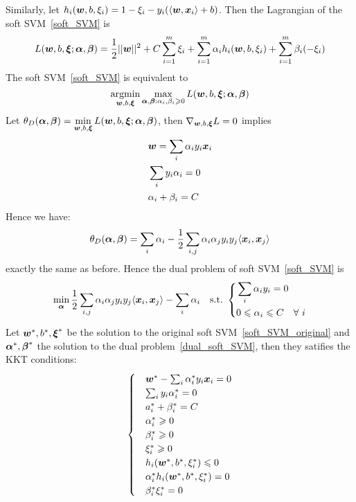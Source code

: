 Similarly, let $h_i(\boldsymbol{w}, b, \xi_i) = 1 - \xi_i - y_i(\langle\boldsymbol{w}, \boldsymbol{x}_i\rangle + b)$. Then the Lagrangian
of the soft SVM~\eqref{soft_SVM} is
$$L(\boldsymbol{w}, b, \boldsymbol{\xi}; \boldsymbol{\alpha}, \boldsymbol{\beta}) = \frac{1}{2}||\boldsymbol{w}||^2 + C\sum_{i=1}^m \xi_i + \sum_{i=1}^m
\alpha_i h_i(\boldsymbol{w}, b, \xi_i) + \sum_{i=1}^m \beta_i (-\xi_i)$$
The soft SVM~\eqref{soft_SVM} is equivalent to
$$\operatorname*{argmin}_{\boldsymbol{w}, b, \boldsymbol{\xi}}\max_{\boldsymbol{\alpha}, \boldsymbol{\beta}: \alpha_i, \beta_i \geqslant 0}
L(\boldsymbol{w}, b, \boldsymbol{\xi}; \boldsymbol{\alpha}, \boldsymbol{\beta})$$
Let $\displaystyle\theta_D(\boldsymbol{\alpha}, \boldsymbol{\beta}) = \min_{\boldsymbol{w}, b, \boldsymbol{\xi}}L(\boldsymbol{w}, b, \boldsymbol{\xi}; \boldsymbol{\alpha}, 
\boldsymbol{\beta})$, then $\nabla_{\boldsymbol{w}, b, \boldsymbol{\xi}} L = 0$ implies
\begin{subequations}
    \begin{align}
    &\boldsymbol{w} = \sum_i \alpha_i y_i \boldsymbol{x}_i\label{sub:soft_w}\\
    &\sum_i y_i \alpha_i = 0\label{sub:soft_b}\\
    &\alpha_i + \beta_i = C\label{sub:soft_C}
    \end{align}
\end{subequations}
Hence we have:
\begin{equation}
    \theta_D(\boldsymbol{\alpha}, \boldsymbol{\beta}) =  \sum_i \alpha_i - \frac{1}{2}\sum_{i, j}\alpha_i\alpha_j y_i y_j\langle
    \boldsymbol{x}_i, \boldsymbol{x}_j\rangle
\end{equation}
exactly the same as before. Hence the dual problem of soft SVM~\eqref{soft_SVM} is
\begin{equation}\label{dual_soft_SVM}
    \min_{\boldsymbol{\alpha}} \frac{1}{2}\sum_{i,j} \alpha_i \alpha_j y_i y_j\langle \boldsymbol{x}_i, \boldsymbol{x}_j\rangle -
    \sum_i \alpha_i\quad\text{s.t.\ } \left\{
    \begin{aligned}
        &\sum_i \alpha_i y_i = 0\\
        &0 \leqslant \alpha_i \leqslant C \quad\forall~i
    \end{aligned}\right.
\end{equation}
Let $\boldsymbol{w}^*, b^*, \boldsymbol{\xi}^*$ be the solution to the original soft SVM~\eqref{soft_SVM_original} and 
$\boldsymbol{\alpha}^*, \boldsymbol{\beta}^*$ the solution to the dual problem~\eqref{dual_soft_SVM}, then they satifies the KKT
conditions:
\begin{equation}\label{KKT_soft_SVM}
    \begin{cases}
        &\boldsymbol{w}^* - \sum_i \alpha_i^* y_i \boldsymbol{x}_i = 0\\
        &\sum_i y_i \alpha_i^* = 0\\
        & a_i^* + \beta_i^* = C\\
        & \alpha_i^* \geqslant 0\\
        & \beta_i^* \geqslant 0\\
        & \xi_i^* \geqslant 0\\
        & h_i(\boldsymbol{w}^*, b^*, \xi_i^*) \leqslant 0\\
        & \alpha_i^* h_i(\boldsymbol{w}^*, b^*, \xi_i^*) = 0\\
        & \beta_i^* \xi_i^* = 0
    \end{cases}
\end{equation}
